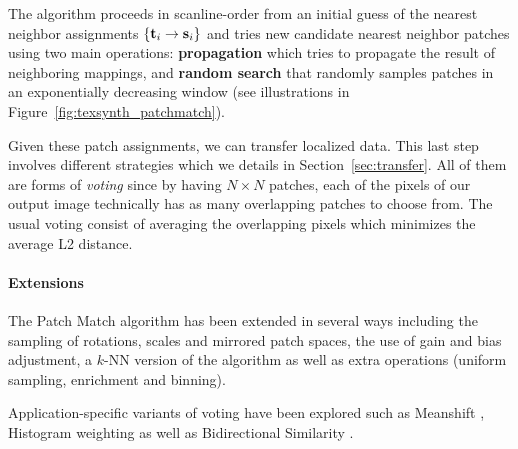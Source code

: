 The algorithm proceeds in scanline-order from an initial guess of the nearest neighbor assignments $\{\mathbf{t}_i \to \mathbf{s}_i\}$ and tries new candidate nearest neighbor patches using two main operations:
\textbf{propagation} which tries to propagate the result of neighboring mappings, and 
\textbf{random search} that randomly samples patches in an exponentially decreasing window (see illustrations in Figure~\ref{fig:texsynth_patchmatch}).

Given these patch assignments, we can transfer localized data.
This last step involves different strategies which we details in Section~\ref{sec:transfer}. 
All of them are forms of \emph{voting} since by having $N\times N$ patches, each of the pixels of our output image technically has as many overlapping patches to choose from.
The usual voting consist of averaging the overlapping pixels which minimizes the average L2 distance.

\paragraph{Extensions}
The Patch Match algorithm has been extended in several ways \cite{Barnes10} including the sampling of rotations, scales and mirrored patch spaces, the use of gain and bias adjustment, a $k$-NN version of the algorithm as well as extra operations (uniform sampling, enrichment and binning).

Application-specific variants of voting have been explored such as Meanshift \cite{Wexler07}, Histogram weighting \cite{Kopf07} as well as Bidirectional Similarity \cite{Simakov08}.